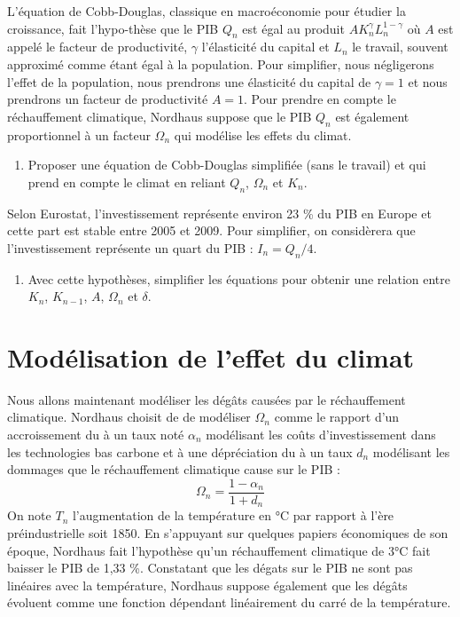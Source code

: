 \documentclass[12pt]{article}
\newcommand{\ques}[1]{\begin{enumerate}[resume]
\item  #1
\end{enumerate}}
\newcommand{\rep}[1]{\textit{Réponse :} #1 \\}
\renewcommand{\rep}[1]{ }
\theoremstyle{remark}
\begin{document}
L'équation de Cobb-Douglas, classique en macroéconomie pour étudier la croissance, fait l'hypo-thèse que le PIB $Q_n$ est égal au produit $AK_n^\gamma L_n^{1-\gamma}$ où $A$ est appelé le facteur de productivité, $\gamma$ l'élasticité du capital et $L_n$ le travail, souvent approximé comme étant égal à la population.
Pour simplifier, nous négligerons l'effet de la population, nous prendrons une élasticité du capital de $\gamma=1$ et nous prendrons un facteur de productivité $A=1$.
Pour prendre en compte le réchauffement climatique, Nordhaus suppose que le PIB $Q_n$ est également proportionnel à un facteur $\Omega_n$ qui modélise les effets du climat. 
\ques{  Proposer une équation de Cobb-Douglas simplifiée (sans le travail) et qui prend en compte le climat en reliant $Q_{n}$, $\Omega_n$ et $K_{n}$.
}
\rep{ $Q_{n}=A \Omega_n K_n$ }
Selon Eurostat, l'investissement représente environ 23 \% du PIB en Europe et cette part est stable entre 2005 et 2009. Pour simplifier, on considèrera que l'investissement représente un quart du PIB : $I_n=Q_n/4$.
\ques{Avec cette hypothèses, simplifier les équations pour obtenir une relation entre $K_n$, $K_{n-1}$, $A$, $\Omega_n$ et $\delta$. \label{ques:dynamique_K_1}}
\rep{\begin{equation*} K_n=\frac{1- \delta}{1- \frac{A\Omega_n}{4}} K_{n-1}\end{equation*}}


\section{Modélisation de l'effet du climat}

Nous allons maintenant modéliser les dégâts causées par le réchauffement climatique. Nordhaus choisit de de modéliser $\Omega_n$ comme le rapport d'un accroissement du à un taux noté $\alpha_n$ modélisant les coûts d'investissement dans les technologies bas carbone et à une dépréciation du à un taux $d_n$ modélisant les dommages que le réchauffement climatique cause sur le PIB :
\begin{equation*}
\Omega_n=\frac{1-\alpha_n}{1+d_n}
\end{equation*}
On note $T_n$ l'augmentation de la température en °C par rapport à l'ère préindustrielle soit 1850.
En s'appuyant sur quelques papiers économiques de son époque, Nordhaus fait l'hypothèse qu'un réchauffement climatique de 3°C fait baisser le PIB de 1,33 \%. 
Constatant que les dégats sur le PIB ne sont pas linéaires avec la température, Nordhaus suppose également que les dégâts évoluent comme une fonction dépendant linéairement du carré de la température.
\end{document}
